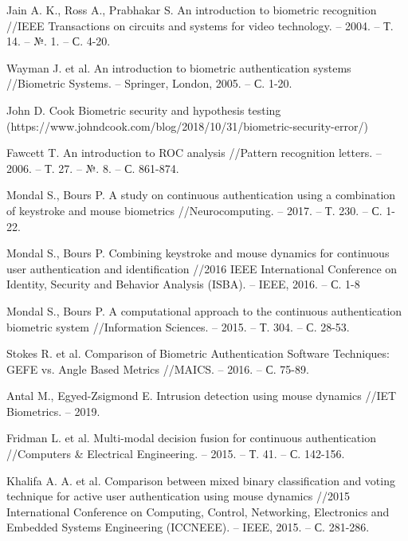 \documentclass[12pt]{article}
\begin{document}
    \begin{thebibliography}{20}
        Jain A. K., Ross A., Prabhakar S. An introduction to biometric recognition //IEEE Transactions on circuits and systems for video technology. – 2004. – Т. 14. – №. 1. – С. 4-20.

        Wayman J. et al. An introduction to biometric authentication systems //Biometric Systems. – Springer, London, 2005. – С. 1-20.

        John D. Cook Biometric security and hypothesis testing (https://www.johndcook.com/blog/2018/10/31/biometric-security-error/)

        Fawcett T. An introduction to ROC analysis //Pattern recognition letters. – 2006. – Т. 27. – №. 8. – С. 861-874.

        Mondal S., Bours P. A study on continuous authentication using a combination of keystroke and mouse biometrics //Neurocomputing. – 2017. – Т. 230. – С. 1-22.

        Mondal S., Bours P. Combining keystroke and mouse dynamics for continuous user authentication and identification //2016 IEEE International Conference on Identity, Security and Behavior Analysis (ISBA). – IEEE, 2016. – С. 1-8

        Mondal S., Bours P. A computational approach to the continuous authentication biometric system //Information Sciences. – 2015. – Т. 304. – С. 28-53.

        Stokes R. et al. Comparison of Biometric Authentication Software Techniques: GEFE vs. Angle Based Metrics //MAICS. – 2016. – С. 75-89.

        Antal M., Egyed-Zsigmond E. Intrusion detection using mouse dynamics //IET Biometrics. – 2019.

        Fridman L. et al. Multi-modal decision fusion for continuous authentication //Computers & Electrical Engineering. – 2015. – Т. 41. – С. 142-156.

        Khalifa A. A. et al. Comparison between mixed binary classification and voting technique for active user authentication using mouse dynamics //2015 International Conference on Computing, Control, Networking, Electronics and Embedded Systems Engineering (ICCNEEE). – IEEE, 2015. – С. 281-286.


\end{thebibliography}
\end{document}
